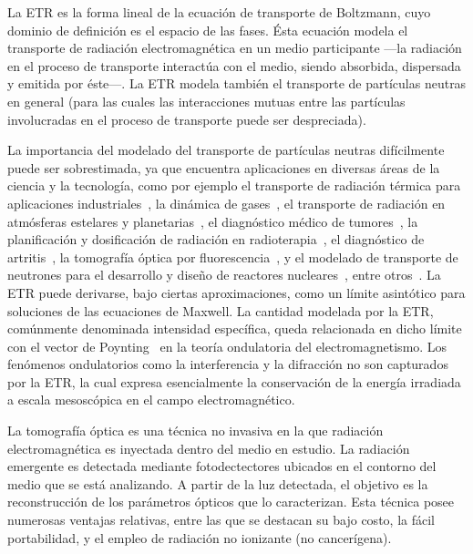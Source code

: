 La ETR es la forma lineal de la ecuación de transporte de Boltzmann, 
cuyo dominio de definición es el espacio de las fases. Ésta ecuación modela el transporte 
de radiación electromagnética en un medio participante ---la radiación en el proceso de transporte 
interactúa con el medio, siendo absorbida, dispersada y emitida por éste---. La ETR modela también el transporte de partículas neutras en
 general (para las cuales las interacciones mutuas entre las partículas involucradas 
 en el proceso de transporte puede ser despreciada).

La importancia del modelado del transporte de partículas neutras 
difícilmente puede ser sobrestimada, ya que encuentra aplicaciones 
en diversas áreas de la ciencia y la tecnología, 
como por ejemplo el transporte de radiación 
 térmica para aplicaciones industriales~\cite{Howell2010, Thynell1998}, 
 la dinámica de gases~\cite{Duderstadt1979}, 
 el transporte de radiación en atmósferas estelares y 
 planetarias~\cite{Qin2015, Dymond1997, Chandrasekhar1960}, 
 el diagnóstico médico de tumores~\cite{Zhu2005, Zhu2010, Fujii2016b}, 
 la planificación y dosificación de radiación en radioterapia~\cite{Vassiliev2010,Bedford2019}, 
 el diagnóstico de artritis~\cite{Klose2002, Netz2001}, 
 la tomografía óptica por fluorescencia~\cite{Klose2005,Klose2010, Ren2010},
 y el modelado de transporte de neutrones para el desarrollo 
 y diseño de reactores nucleares~\cite{Larsen2006, Sanchez1982, Anli2006}, 
 entre otros~\cite {Mishchenko1999, Prasher2003}. 
 La ETR puede derivarse, bajo ciertas aproximaciones, como un límite asintótico 
 para soluciones de las ecuaciones de Maxwell. La cantidad modelada por la ETR, comúnmente denominada 
 intensidad específica, queda relacionada en dicho límite con el vector de Poynting~\cite{Mishchenko2002, Ripoll2011} 
 en la teoría ondulatoria del electromagnetismo. Los fenómenos ondulatorios como la interferencia y la difracción no son
 capturados por la ETR, la cual expresa esencialmente la conservación de la
 energía irradiada a escala mesoscópica en el campo electromagnético.

  
 La tomografía óptica es una técnica no invasiva en la que
 radiación electromagnética es inyectada dentro del medio
 en estudio.
 La radiación emergente es detectada mediante fotodectectores 
 ubicados en el contorno del medio que se está analizando. 
 A partir de la luz detectada, el objetivo es la reconstrucción de
 los parámetros ópticos que lo caracterizan. 
Esta técnica posee numerosas 
 ventajas relativas, entre las que se destacan su bajo costo, la fácil portabilidad, y 
 el empleo de radiación no ionizante (no cancerígena). 
 
